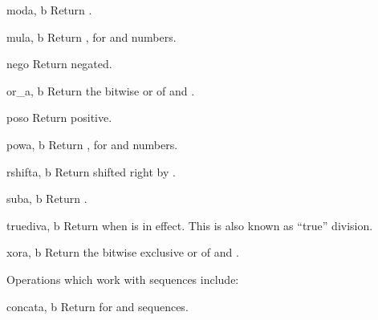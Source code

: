 \begin{funcdesc}{mod}{a, b}
Return  \code{\%} .
\end{funcdesc}

\begin{funcdesc}{mul}{a, b}
Return  \code{*} , for  and  numbers.
\end{funcdesc}

\begin{funcdesc}{neg}{o}
Return  negated.
\end{funcdesc}

\begin{funcdesc}{or_}{a, b}
Return the bitwise or of  and .
\end{funcdesc}

\begin{funcdesc}{pos}{o}
Return  positive.
\end{funcdesc}

\begin{funcdesc}{pow}{a, b}
Return  \code{**} , for  and  numbers.
\end{funcdesc}

\begin{funcdesc}{rshift}{a, b}
Return  shifted right by .
\end{funcdesc}

\begin{funcdesc}{sub}{a, b}
Return  \code{-} .
\end{funcdesc}

\begin{funcdesc}{truediv}{a, b}
Return  \code{/}  when  is in
effect.  This is also known as ``true'' division.
\end{funcdesc}

\begin{funcdesc}{xor}{a, b}
Return the bitwise exclusive or of  and .
\end{funcdesc}


Operations which work with sequences include:

\begin{funcdesc}{concat}{a, b}
Return  \code{+}  for  and  sequences.
\end{funcdesc}

